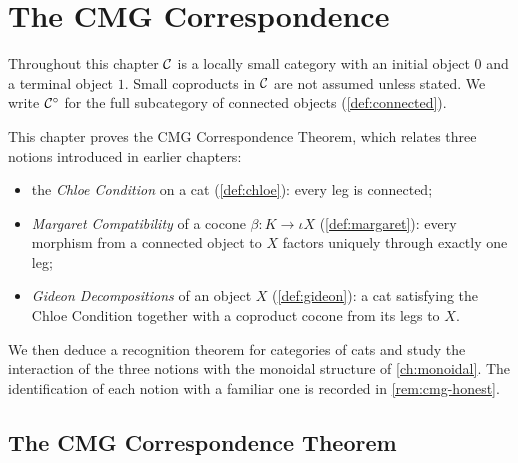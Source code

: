 \chapter{The CMG Correspondence}\label{ch:cmg}

\begin{assumption}\label{ass:ch13}
Throughout this chapter $\mathcal{C}$ is a locally small category with an initial
object $0$ and a terminal object $1$. Small coproducts in $\mathcal{C}$ are not assumed
unless stated. We write $\mathcal{C}^\circ$ for the full subcategory of connected
objects (\cref{def:connected}).
\end{assumption}

This chapter proves the CMG Correspondence Theorem, which relates three notions
introduced in earlier chapters:
\begin{itemize}
\item the \emph{Chloe Condition} on a cat (\cref{def:chloe}): every leg is
  connected;
\item \emph{Margaret Compatibility} of a cocone $\beta\colon K\to\iota X$
  (\cref{def:margaret}): every morphism from a connected object to $X$ factors
  uniquely through exactly one leg;
\item \emph{Gideon Decompositions} of an object $X$ (\cref{def:gideon}): a cat
  satisfying the Chloe Condition together with a coproduct cocone from its legs
  to $X$.
\end{itemize}
We then deduce a recognition theorem for categories of cats and study the
interaction of the three notions with the monoidal structure of
\cref{ch:monoidal}. The identification of each notion with a familiar one is
recorded in \cref{rem:cmg-honest}.

\section{The CMG Correspondence Theorem}\label{sec:cmg-theorem}

